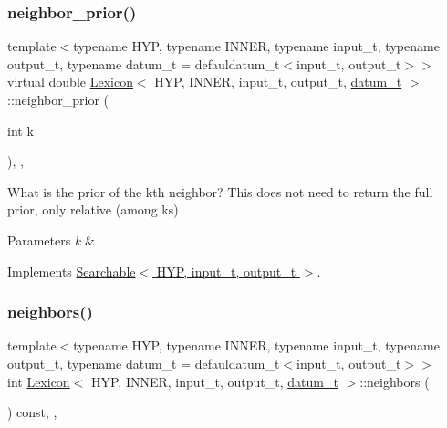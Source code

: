 \subsubsection{\texorpdfstring{neighbor\+\_\+prior()}{neighbor\_prior()}}
{\footnotesize\ttfamily template$<$typename H\+YP, typename I\+N\+N\+ER, typename input\+\_\+t, typename output\+\_\+t, typename datum\+\_\+t = defauldatum\+\_\+t$<$input\+\_\+t, output\+\_\+t$>$$>$ \\
virtual double \hyperlink{class_lexicon}{Lexicon}$<$ H\+YP, I\+N\+N\+ER, input\+\_\+t, output\+\_\+t, \hyperlink{class_bayesable_a9f1a6c0cd7855550fa10b1a8f13a5867}{datum\+\_\+t} $>$\+::neighbor\+\_\+prior (\begin{DoxyParamCaption}\item[{int}]{k }\end{DoxyParamCaption})\hspace{0.3cm}{\ttfamily [inline]}, {\ttfamily [override]}, {\ttfamily [virtual]}}



What is the prior of the k\textquotesingle{}th neighbor? This does not need to return the full prior, only relative (among ks) 


\begin{DoxyParams}{Parameters}
{\em k} & \\
\hline
\end{DoxyParams}


Implements \hyperlink{class_searchable_abebbaaf94b0502a35d0ba686af73bd08}{Searchable$<$ H\+Y\+P, input\+\_\+t, output\+\_\+t $>$}.

\mbox{\label{class_lexicon_a6419f323377d4c524363707eee0cae09}} 
\subsubsection{\texorpdfstring{neighbors()}{neighbors()}}
{\footnotesize\ttfamily template$<$typename H\+YP, typename I\+N\+N\+ER, typename input\+\_\+t, typename output\+\_\+t, typename datum\+\_\+t = defauldatum\+\_\+t$<$input\+\_\+t, output\+\_\+t$>$$>$ \\
int \hyperlink{class_lexicon}{Lexicon}$<$ H\+YP, I\+N\+N\+ER, input\+\_\+t, output\+\_\+t, \hyperlink{class_bayesable_a9f1a6c0cd7855550fa10b1a8f13a5867}{datum\+\_\+t} $>$\+::neighbors (\begin{DoxyParamCaption}{ }\end{DoxyParamCaption}) const\hspace{0.3cm}{\ttfamily [inline]}, {\ttfamily [override]}, {\ttfamily [virtual]}}



